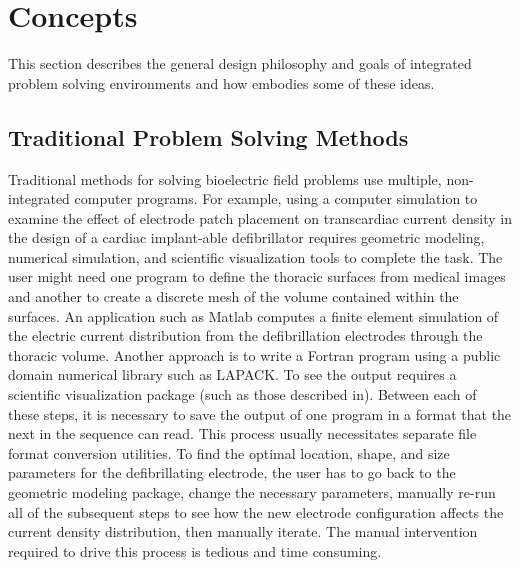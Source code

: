 %
%
%
%
%

\section{Concepts}
\label{sec:concepts} 

This section describes the general design philosophy and goals of
integrated problem solving environments  and how \BIOPSE{} embodies some of these ideas.

\subsection{Traditional Problem Solving Methods}

Traditional methods for solving bioelectric field problems use
multiple, non-integrated computer programs.  For example, using
a computer simulation to examine the effect of electrode patch placement on
transcardiac current density in the design of a cardiac implant-able
defibrillator\cite{CRJ:Sch95b} requires geometric modeling, numerical
simulation, and scientific visualization tools to complete the task.  The
user might need one program to define the thoracic surfaces from medical
images and another to create a discrete mesh of the volume contained within
the surfaces\cite{CRJ:Sch93b}. An application such as Matlab computes a
finite element simulation of the electric current distribution from the
defibrillation electrodes through the thoracic volume\cite{RSM:And93}.
Another approach is to write a Fortran program using a public domain
numerical library such as LAPACK\@ {}.  To see the output
requires a scientific visualization package (such as those described
in\cite{RSM:All91}).  Between each of these steps, it is necessary to
save the output of one program in a format that the next in the sequence
can read. This process usually necessitates separate file format conversion
utilities.  To find the optimal location, shape, and size parameters for
the defibrillating electrode, the user has to go back to the
geometric modeling package, change the necessary parameters, manually
re-run all of the subsequent steps to see how the new electrode
configuration affects the current density distribution, then manually
iterate.  The manual intervention required to drive this process is
tedious and time consuming.

